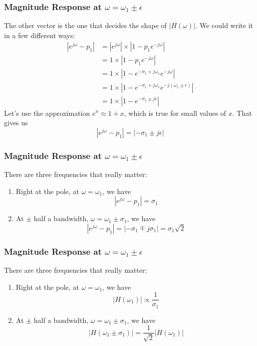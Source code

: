 \documentclass{beamer}
\begin{document}
\begin{frame}
  \frametitle{Magnitude Response at $\omega=\omega_1\pm\epsilon$}

  The other vector is the one that decides the shape of $|H(\omega)|$.  We could write
  it in a  few different ways:
  \begin{align*}
    |e^{j\omega}-p_1|&= |e^{j\omega}|\times |1-p_1e^{-j\omega}|\\
    &= 1\times |1-p_1e^{-j\omega}|\\
    &= 1\times |1-e^{-\sigma_1+j\omega_1}e^{-j\omega}|\\
    &= 1\times |1-e^{-\sigma_1+j\omega_1}e^{-j(\omega_1\pm\epsilon)}|\\
    &= 1\times |1-e^{-\sigma_1\pm j\epsilon}|
  \end{align*}
  Let's use the approximation $e^x\approx 1+x$, which is true for
  small values of $x$.  That gives us
  \begin{displaymath}
    |e^{j\omega}-p_1|= |-\sigma_1\pm j\epsilon|
  \end{displaymath}
\end{frame}

\begin{frame}
  \frametitle{Magnitude Response at $\omega=\omega_1\pm\epsilon$}

  There are three frequencies that really matter:
  \begin{enumerate}
  \item Right at the pole, at $\omega=\omega_1$, we have
    \begin{displaymath}
      |e^{j\omega}-p_1|= \sigma_1
    \end{displaymath}
  \item At $\pm$ half a bandwidth, $\omega=\omega_1\pm\sigma_1$, we have
    \begin{displaymath}
      |e^{j\omega}-p_1|= |-\sigma_1\mp j\sigma_1| = \sigma_1\sqrt{2}
    \end{displaymath}
  \end{enumerate}
\end{frame}  


\begin{frame}
  \frametitle{Magnitude Response at $\omega=\omega_1\pm\epsilon$}

  There are three frequencies that really matter:
  \begin{enumerate}
  \item Right at the pole, at $\omega=\omega_1$, we have
    \begin{displaymath}
      |H(\omega_1)| \propto \frac{1}{\sigma_1}
    \end{displaymath}
  \item At $\pm$ half a bandwidth, $\omega=\omega_1\pm\sigma_1$, we have
    \begin{displaymath}
      |H(\omega_1\pm\sigma_1)| = \frac{1}{\sqrt{2}}|H(\omega_1)|
    \end{displaymath}
  \end{enumerate}
\end{frame}  
\end{document}
